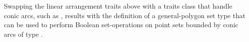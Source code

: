 Swapping the linear arrangement traits 
above with a traits class that handle conic arcs, such as
, results with the definition of a
general-polygon set type that can be used to perform Boolean 
set-operations on point sets bounded by conic arcs of type
.
